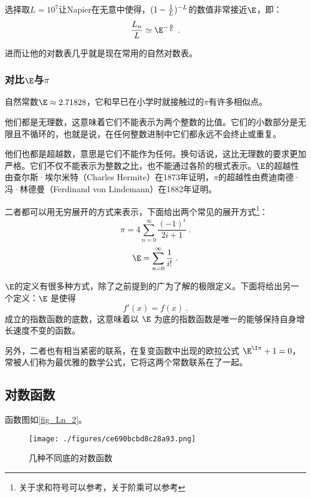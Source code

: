 选择取$L=10^7$让Napier在无意中使得，$(1-{1\over L})^{-L}$的数值非常接近$\E$，即：
\begin{equation}
{L_n\over L}\simeq\E^{-{n\over L}}~.
\end{equation}

进而让他的对数表几乎就是现在常用的自然对数表。

\subsubsection{对比$\E$与$\pi$}

自然常数$\E \approx 2.71828$，它和早已在小学时就接触过的$\pi$有许多相似点。

他们都是无理数，这意味着它们不能表示为两个整数的比值。它们的小数部分是无限且不循环的，也就是说，在任何整数进制中它们都永远不会终止或重复。

他们也都是超越数，意思是它们不能作为任何。换句话说，这比无理数的要求更加严格。它们不仅不能表示为整数之比，也不能通过各阶的根式表示。$\E$的超越性由查尔斯·埃尔米特（Charles Hermite）在1873年证明，$\pi$的超越性由费迪南德·冯·林德曼（Ferdinand von Lindemann）在1882年证明。

二者都可以用无穷展开的方式来表示，下面给出两个常见的展开方式\footnote{关于求和符号可以参考，关于阶乘可以参考}：
\begin{equation}
\pi=4\sum_{n=0}^\infty\frac{(-1)^i}{2i+1}~.
\end{equation}
\begin{equation}
\E=\sum_{n=0}^\infty\frac{1}{i!}~.
\end{equation}

$\E$的定义有很多种方式，除了之前提到的广为了解的极限定义。下面将给出另一个定义：$\E$ 是使得
\begin{equation}
f'(x) = f(x)~.
\end{equation}
成立的指数函数的底数，这意味着以 $\E$ 为底的指数函数是唯一的能够保持自身增长速度不变的函数。

另外，二者也有相当紧密的联系，在复变函数中出现的欧拉公式 $\E^{\I \pi} + 1 = 0$，常被人们称为最优雅的数学公式，它将这两个常数联系在了一起。

\subsection{对数函数}

函数图如\autoref{fig_Ln_2}。
\begin{figure}[ht]
\centering
\texttt{[image: ./figures/ce690bcbd8c28a93.png]}
\caption{几种不同底的对数函数} \label{fig_Ln_2}
\end{figure}


